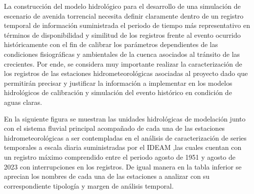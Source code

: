 \documentclass{article} %
\begin{document}
La construcci\'{o}n del modelo hidrol\'{o}gico para el desarrollo de una simulaci\'{o}n de escenario de avenida torrencial necesita definir claramente dentro de un registro temporal de informaci\'{o}n suministrada el periodo de tiempo m\'{a}s representativo en t\'{e}rminos de disponibilidad y similitud de los registros frente al evento ocurrido hist\'{o}ricamente con el fin de calibrar los par\'{a}metros dependientes de las condiciones fisiogr\'{a}ficas y ambientales de la cuenca asociados al tr\'{a}nsito de las crecientes. Por ende, se considera muy importante realizar la caracterizaci\'{o}n de los registros de las estaciones hidrometeorol\'{o}gicas asociadas al proyecto dado que permitir\'{a}n precisar y justificar la informaci\'{o}n a implementar en los modelos hidrol\'{o}gicos de calibraci\'{o}n y simulaci\'{o}n del evento hist\'{o}rico en condici\'{o}n de aguas claras.

En la siguiente figura se muestran las unidades hidrol\'{o}gicas de modelaci\'{o}n junto con el sistema fluvial principal acompa\~{n}ado de cada una de las estaciones hidrometeorol\'{o}gicas a ser contempladas en el an\'{a}lisis de caracterizaci\'{o}n de series temporales a escala diaria suministradas por el IDEAM ,las cuales cuentan con un registro máximo comprendido entre el periodo agosto de 1951 y agosto de 2023 con interrupciones en los registros. De igual manera en la tabla inferior se aprecian los nombres de cada una de las estaciones a analizar con su correspondiente tipología y margen de análisis temporal.
\end{document}
